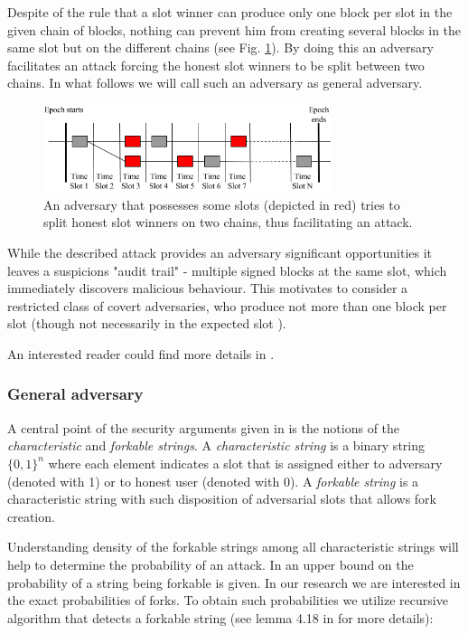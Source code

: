\documentclass[10pt,a4paper]{article}
\numberwithin{equation}{section} %
\theoremstyle{plain}
\theoremstyle{definition}
\theoremstyle{remark}
\begin{document}
    Despite of the rule that a slot winner can produce only one block per slot in the given chain of blocks, nothing can prevent him from creating several blocks in the same slot but on the different chains (see Fig. \ref{fig:ouroboros_split_attack}). By doing this an adversary facilitates an attack forcing the honest slot winners to be split between two chains. In what follows we will call such an adversary as general adversary.
    \begin{figure}[h] 
        \centering
        \includegraphics[width=0.75\textwidth]{ouroboros_split_attack}
        \caption{An adversary that possesses some slots (depicted in red) tries to split honest slot winners on two chains, thus facilitating an attack.}
        \label{fig:ouroboros_split_attack}
    \end{figure}
    
    While the described attack provides an adversary significant opportunities it leaves a suspicions "audit trail" - multiple signed blocks at the same slot, which immediately discovers malicious behaviour. This motivates to consider a restricted class of covert adversaries, who produce not more than one block per slot (though not necessarily in the expected slot \cite{KRDO16}).
    
    An interested reader could find more details in \cite{KRDO16, RMKQ17}.
    
    \subsubsection{General adversary} \label{sec:general_adv}
    
     A central point of the security arguments given in \cite{KRDO16} is the notions of the \textit{characteristic} and \textit{forkable strings}. A \textit{characteristic string} is a binary string \(\{0,1\}^n\) where each element indicates a slot that is assigned either to adversary (denoted with 1) or to honest user (denoted with 0). A \textit{forkable string} is a characteristic string with such disposition of adversarial slots that allows fork creation. 
     
     Understanding density of the forkable strings among all characteristic strings will help to determine the probability of an attack. In \cite{KRDO16} an upper bound on the probability of a string being forkable is given. In our research we are interested in the exact probabilities of forks. To obtain such probabilities we utilize recursive algorithm that detects a forkable string (see lemma 4.18 in \cite{KRDO16} for more details):
     
\end{document}
